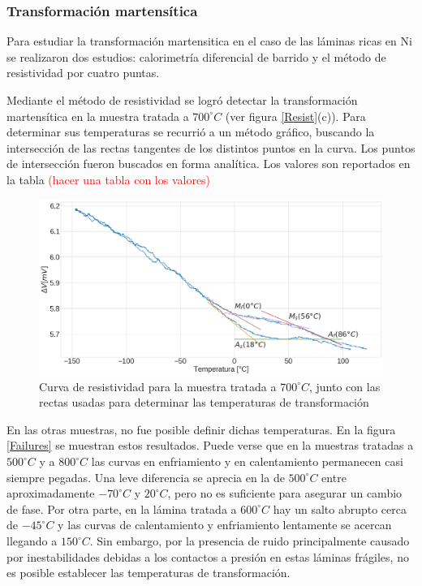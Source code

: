\documentclass[12pt]{article}
\theoremstyle{definition}
\theoremstyle{remark}
\begin{document}
{\subsubsection{Transformación martensítica}
Para estudiar la transformación martensitica en el caso de las láminas ricas en Ni se realizaron dos estudios: calorimetría diferencial de barrido y el método de resistividad por cuatro puntas.

Mediante el método de resistividad se logró detectar la transformación martensítica en la muestra tratada a $700 ^\circ C$ (ver figura \ref{Resist}(c)). Para determinar sus temperaturas se recurrió a un método gráfico, buscando la intersección de las rectas tangentes de los distintos puntos en la curva. Los puntos de intersección fueron buscados en forma analítica. Los valores son reportados en la tabla \textcolor{red}{(hacer una tabla con los valores)}

\begin{figure}[H]
 	\centering
	\includegraphics[scale=0.3]{img/Resistance_700.png}
 	\caption{Curva de resistividad para la muestra tratada a $700 ^\circ C$, junto con las rectas usadas para determinar las temperaturas de transformación}
	\label{Res700}
\end{figure}

En las otras muestras, no fue posible definir dichas temperaturas. En la figura \ref{Failures} se muestran estos resultados. Puede verse que en la muestras tratadas a $500 ^\circ C$ y a $800 ^\circ C$ las curvas en enfriamiento y en calentamiento permanecen casi siempre pegadas. Una leve diferencia se aprecia en la de  $500 ^\circ C$ entre aproximadamente $-70 ^\circ C$ y $20 ^\circ C$, pero no es suficiente para asegurar un cambio de fase. Por otra parte, en la lámina tratada a $600 ^\circ C$ hay un salto abrupto cerca de  $-45 ^\circ C$ y las curvas de calentamiento y enfriamiento lentamente se acercan llegando a $150 ^\circ C$. Sin embargo, por la presencia de ruido principalmente causado por inestabilidades debidas a los contactos a presión en estas láminas frágiles, no es posible establecer las temperaturas de transformación.

}
\end{document}
